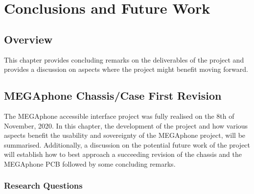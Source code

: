 
\chapter{Conclusions and Future Work} %

\label{Chapter6} %


\section{Overview}
This chapter provides concluding remarks on the deliverables of the project and provides a discussion on aspects where the project might benefit moving forward.


\section{MEGAphone Chassis/Case First Revision}
The MEGAphone accessible interface project was fully realised on the 8th of November, 2020.
In this chapter, the development of the project and how various aspects benefit the usability and sovereignty of the MEGAphone project, will be summarised. %
Additionally, a discussion on the potential future work of the project will establish how to best approach a succeeding revision of the chassis and the MEGAphone PCB followed by some concluding remarks.

\subsection{Research Questions}

